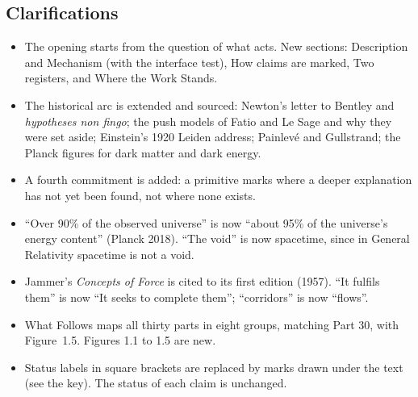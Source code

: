 \documentclass[11pt,a4paper]{article}
\begin{document}
\subsection*{Clarifications}
\begin{itemize}
  \item The opening starts from the question of what acts. New sections: Description and Mechanism (with the interface test), How claims are marked, Two registers, and Where the Work Stands.
  \item The historical arc is extended and sourced: Newton's letter to Bentley and \emph{hypotheses non fingo}; the push models of Fatio and Le Sage and why they were set aside; Einstein's 1920 Leiden address; Painlevé and Gullstrand; the Planck figures for dark matter and dark energy.
  \item A fourth commitment is added: a primitive marks where a deeper explanation has not yet been found, not where none exists.
  \item ``Over 90\% of the observed universe'' is now ``about 95\% of the universe's energy content'' (Planck 2018). ``The void'' is now spacetime, since in General Relativity spacetime is not a void.
  \item Jammer's \emph{Concepts of Force} is cited to its first edition (1957). ``It fulfils them'' is now ``It seeks to complete them''; ``corridors'' is now ``flows''.
  \item What Follows maps all thirty parts in eight groups, matching Part 30, with Figure~1.5. Figures 1.1 to 1.5 are new.
  \item Status labels in square brackets are replaced by marks drawn under the text (see the key). The status of each claim is unchanged.
\end{itemize}


\end{document}
